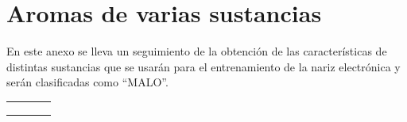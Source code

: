 \chapter{Aromas de varias sustancias}
En este anexo se lleva un seguimiento de la obtención de las características de distintas sustancias que se usarán para el entrenamiento de la nariz electrónica y serán clasificadas como ``MALO''.

\footnotesize
\setlength{\tabcolsep}{4pt}
\begin{xltabular}{\textwidth}{@{} >{\centering\arraybackslash}p{0.18\textwidth} >{\centering\arraybackslash}X >{\centering\arraybackslash}X >{\raggedright\arraybackslash}X @{}}
		\toprule
	 &  &  &  \\
\midrule
\endfirsthead%

		\toprule
	 &  &  &  \\
\midrule
\endhead%

\midrule {}\\
\endfoot%


\end{xltabular}
